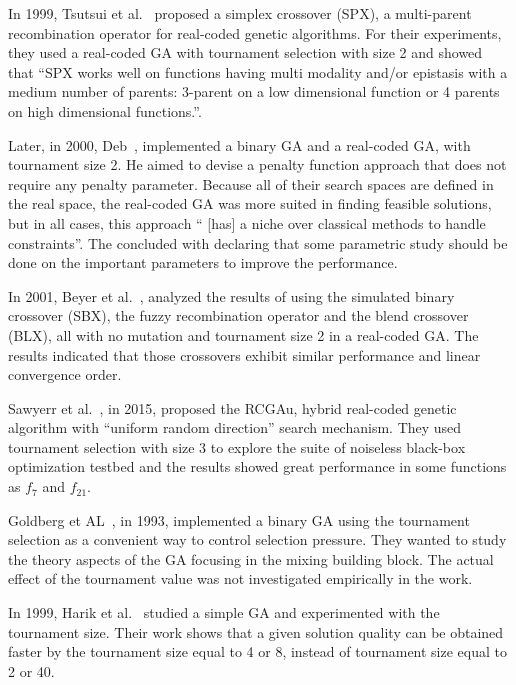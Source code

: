 In 1999, Tsutsui et al.~\cite{tsutsui1999multi} proposed a simplex crossover (SPX), a multi-parent recombination operator for real-coded genetic algorithms. For their experiments, they used a real-coded GA with tournament selection with size 2 and showed that ``SPX works well on functions having multi modality and/or epistasis with a medium number of parents: 3-parent on a low dimensional function or 4 parents on high dimensional functions.''. 

Later, in 2000, Deb~\cite{deb2000efficient}, implemented a binary GA and a real-coded GA, with tournament size 2. He aimed to devise a penalty function approach that does not require any penalty parameter. Because all of their search spaces are defined in the real space, the real-coded GA was more suited in finding feasible solutions, but in all cases, this approach `` [has] a niche over classical methods to handle constraints''. The concluded with declaring that some parametric study should be done on the important parameters to improve the performance.



In 2001, Beyer et al.~\cite{beyer2001self}, analyzed the results of using the simulated binary crossover (SBX), the fuzzy recombination operator and the blend crossover (BLX), all with no mutation and tournament size 2 in a real-coded GA. The results indicated that those crossovers exhibit similar performance and linear convergence order.


Sawyerr et al.~\cite{sawyerr2015benchmarking}, in 2015, proposed the RCGAu, hybrid real-coded genetic algorithm with ``uniform random direction'' search mechanism. They used tournament selection with size 3 to explore the suite of noiseless black-box optimization testbed and the results showed great performance in some functions as $f_7$ and $f_{21}$.

Goldberg et AL~\cite{goldberg1993toward}, in 1993, implemented a binary GA using the tournament selection as a convenient way to control selection pressure. They wanted to study the theory aspects of the GA focusing in the mixing building block. The actual effect of the tournament value was not investigated empirically in the work.

In 1999, Harik et al.~\cite{harik1999compact} studied a simple GA and experimented with the tournament size. Their work shows that a given solution quality can be obtained faster by the tournament size equal to 4 or 8, instead of tournament size equal to 2 or 40. 

